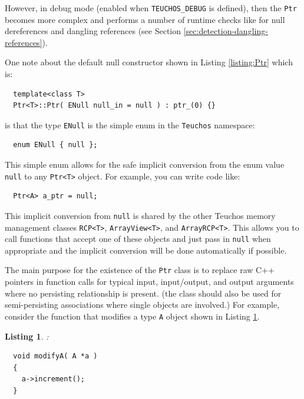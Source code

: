 \documentclass[pdf,ps2pdf,11pt]{SANDreport}
\newtheorem{listing}{Listing}
\begin{document}
However, in debug mode (enabled when {}\texttt{TEUCHOS\_DEBUG} is
defined), then the {}\texttt{Ptr} becomes more complex and performs a
number of runtime checks like for null dereferences and dangling
references (see Section {}\ref{sec:detection-dangling-references}).

One note about the default null constructor shown in Listing
{}\ref{listing:Ptr} which is:

{\small\begin{verbatim}
  template<class T>
  Ptr<T>::Ptr( ENull null_in = null ) : ptr_(0) {}
\end{verbatim}}

{}\noindent{}is that the type {}\texttt{ENull} is the simple enum in
the {}\texttt{Teuchos} namespace:

{\small\begin{verbatim}
  enum ENull { null };
\end{verbatim}}

This simple enum allows for the safe implicit conversion from the enum
value {}\texttt{null} to any {}\texttt{Ptr<T>} object.  For example,
you can write code like:

{\small\begin{verbatim}
  Ptr<A> a_ptr = null;
\end{verbatim}}

This implicit conversion from {}\texttt{null} is shared by the other
Teuchos memory management classes {}\texttt{RCP<T>},
{}\texttt{ArrayView<T>}, and {}\texttt{ArrayRCP<T>}.  This allows you
to call functions that accept one of these objects and just pass in
{}\texttt{null} when appropriate and the implicit conversion will be
done automatically if possible.

The main purpose for the existence of the {}\texttt{Ptr} class is to
replace raw C++ pointers in function calls for typical input,
input/output, and output arguments where no persisting relationship is
present.  (the class {} should also be used for
semi-persisting associations where single objects are involved.)  For
example, consider the function that modifies a type {}\texttt{A}
object shown in Listing {}\ref{listing:modifyA-rawPtr}.

\begin{listing}:\\
\label{listing:modifyA-rawPtr}
{\small\begin{verbatim}
  void modifyA( A *a )
  {
    a->increment();
  }
\end{verbatim}}
\end{listing}
\end{document}
